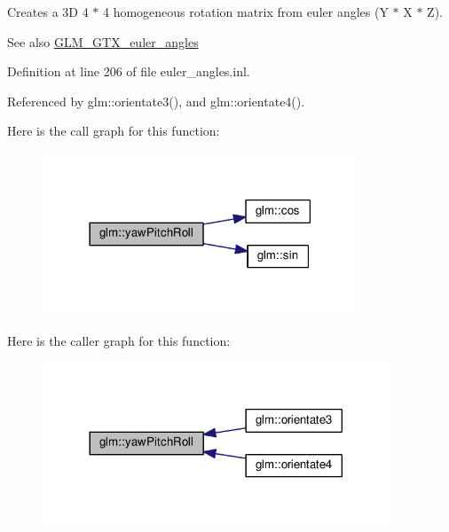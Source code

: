 Creates a 3D 4 $\ast$ 4 homogeneous rotation matrix from euler angles (Y $\ast$ X $\ast$ Z). \begin{DoxySeeAlso}{See also}
\hyperlink{group__gtx__euler__angles}{G\+L\+M\+\_\+\+G\+T\+X\+\_\+euler\+\_\+angles} 
\end{DoxySeeAlso}


Definition at line 206 of file euler\+\_\+angles.\+inl.



Referenced by glm\+::orientate3(), and glm\+::orientate4().

Here is the call graph for this function\+:
\nopagebreak
\begin{figure}[H]
\begin{center}
\leavevmode
\includegraphics[width=266pt]{d2/d7e/group__gtx__euler__angles_gae6aa26ccb020d281b449619e419a609e_cgraph}
\end{center}
\end{figure}
Here is the caller graph for this function\+:
\nopagebreak
\begin{figure}[H]
\begin{center}
\leavevmode
\includegraphics[width=293pt]{d2/d7e/group__gtx__euler__angles_gae6aa26ccb020d281b449619e419a609e_icgraph}
\end{center}
\end{figure}
